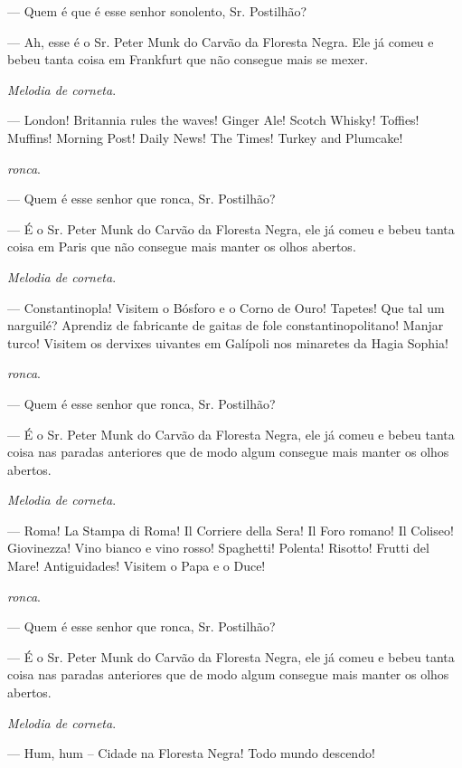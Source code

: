 \begin{myparindent}{0pt}
\begin{Parskip}
 --- Quem é que é esse senhor sonolento, Sr. Postilhão?

 --- Ah, esse é o Sr. Peter Munk do Carvão da Floresta Negra.
Ele já comeu e bebeu tanta coisa em Frankfurt que não consegue mais se
mexer.

\emph{Melodia de corneta}.

 --- London! Britannia rules the waves! Ginger Ale!
Scotch Whisky! Toffies! Muffins! Morning Post! Daily News! The Times!
Turkey and Plumcake!

 \emph{ronca}.

 --- Quem é esse senhor que ronca, Sr. Postilhão?

 --- É o Sr. Peter Munk do Carvão da Floresta Negra, ele já
comeu e bebeu tanta coisa em Paris que não consegue mais manter os olhos
abertos.

\emph{Melodia de corneta}.

 --- Constantinopla! Visitem o Bósforo e o Corno de
Ouro! Tapetes! Que tal um narguilé? Aprendiz de fabricante de gaitas de
fole constantinopolitano! Manjar turco! Visitem os dervixes uivantes em
Galípoli nos minaretes da Hagia Sophia!

 \emph{ronca}.

 --- Quem é esse senhor que ronca, Sr. Postilhão?

 --- É o Sr. Peter Munk do Carvão da Floresta Negra, ele já
comeu e bebeu tanta coisa nas paradas anteriores que de modo algum
consegue mais manter os olhos abertos.

\emph{Melodia de corneta}.

 --- Roma! La Stampa di Roma! Il Corriere della Sera! Il
Foro romano! Il Coliseo! Giovinezza! Vino bianco e vino rosso!
Spaghetti! Polenta! Risotto! Frutti del Mare! Antiguidades! Visitem o
Papa e o Duce!

 \emph{ronca}.

 --- Quem é esse senhor que ronca, Sr. Postilhão?

 --- É o Sr. Peter Munk do Carvão da Floresta Negra, ele já
comeu e bebeu tanta coisa nas paradas anteriores que de modo algum
consegue mais manter os olhos abertos.

\emph{Melodia de corneta}.

 --- Hum, hum -- Cidade na Floresta Negra! Todo mundo descendo!


\end{Parskip}
\end{myparindent}
